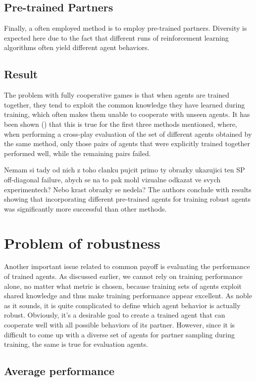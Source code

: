 \subsection{Pre-trained Partners}
Finally, a often employed method is to employ pre-trained partners.
Diversity is expected here due to the fact that different runs of reinforcement learning algorithms often yield different agent behaviors.


\subsection{Result}\label{offDiagonalReport}
The problem with fully cooperative games is that when agents are trained together, they tend to exploit the common knowledge they have learned during training, which often makes them unable to cooperate with unseen agents.
It has been shown (\cite{10.1007/978-3-030-63823-8_46}) that this is true for the first three methods mentioned, 
where, when performing a cross-play evaluation of the set of different agents obtained by the same method, 
only those pairs of agents that were explicitly trained together performed well, while the remaining pairs failed.

{\color{blue} Nemam si tady od nich z toho clanku pujcit primo ty obrazky ukazujici ten SP off-diagonal failure, abych se na to pak mohl vizualne odkazat ve svych experimentech? 
Nebo krast obrazky se nedela?}
The authors conclude with results showing that incorporating different pre-trained agents for training robust agents was significantly more successful than other methods.


\section{Problem of robustness}
Another important issue related to common payoff is evaluating the performance of trained agents.
As discussed earlier, we cannot rely on training performance alone, no matter what metric is chosen, because training sets of agents exploit shared knowledge and thus make training performance appear excellent.
As noble as it sounds, it is quite complicated to define which agent behavior is actually robust.
Obviously, it's a desirable goal to create a trained agent that can cooperate well with all possible behaviors of its partner.
However, since it is difficult to come up with a diverse set of agents for partner sampling during training, the same is true for evaluation agents.

\subsection{Average performance}


